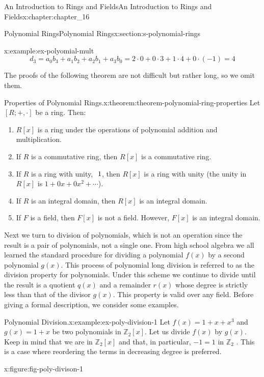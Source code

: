 \documentclass[twoside,10pt,]{book}
\numberwithin{equation}{section}
\begin{document}
\begin{chapterptx}{An Introduction to Rings and Fields}{}{An Introduction to Rings and Fields}{}{}{x:chapter:chapter_16}
\begin{sectionptx}{Polynomial Rings}{}{Polynomial Rings}{}{}{x:section:s-polynomial-rings}
\begin{example}{}{x:example:ex-polyomial-mult}
\begin{equation*}
d_3=a_0 b_3+a_1 b_2+a_2 b_1+a_3b_0 =2\cdot 0+0\cdot 3+1\cdot 4+0\cdot (-1)=4
\end{equation*}
%
\end{example}
The proofs of the following theorem are not difficult but rather long, so we omit them.%
\begin{theorem}{Properties of Polynomial Rings.}{}{x:theorem:theorem-polynomial-ring-properties}%
Let \([R; +, \cdot]\) be a ring. Then:%
\begin{enumerate}[label=(\arabic*)]
\item{}\(R[x]\) is a ring under the operations of polynomial addition and multiplication.%
\item{}If \(R\) is a commutative ring, then \(R[x]\) is a commutative ring.%
\item{}If \(R\) is a ring with unity, \(\textup{ 1}\), then \(R[x]\) is a ring with unity (the unity in \(R[x]\) is \(1 + 0x + 0 x^2 + \cdots\)).%
\item{}If \(R\) is an integral domain, then \(R[x]\) is an integral domain.%
\item{}If \(F\) is a field, then \(F[x]\) is not a field. However, \(F[x]\) is an integral domain.%
\end{enumerate}
%
\end{theorem}
Next we turn to division of polynomials, which is not an operation since the result is a pair of polynomials, not a single one. From high school algebra we all learned the standard procedure for dividing a polynomial \(f(x)\) by a second polynomial \(g(x)\). This process of polynomial long division is referred to as the division property for polynomials. Under this scheme we continue to divide until the result is a quotient \(q(x)\) and a remainder \(r(x)\) whose degree is strictly less than that of the divisor \(g(x)\). This property is valid over any field. Before giving a formal description, we consider some examples.%
\begin{example}{Polynomial Division.}{x:example:ex-poly-division-1}%
Let \(f(x) = 1 + x + x^3\) and \(g(x) = 1 + x\) be two polynomials in  \(\mathbb{Z}_2[x]\). Let us divide \(f(x)\) by \(g(x)\). Keep in mind that we are in \(\mathbb{Z}_2[x]\) and that, in particular, \(-1=1\) in \(\mathbb{Z}_2\) .  This is a case where reordering the terms in decreasing degree is preferred.%
\begin{figureptx}{}{x:figure:fig-poly-divison-1}{}%
\begin{image}{0.275}{0.45}{0.275}%

\end{image}
\end{figureptx}
\end{example}
\end{sectionptx}
\end{chapterptx}
\end{document}
